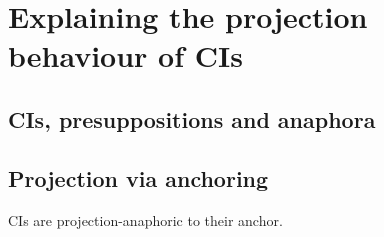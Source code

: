 \section{Explaining the projection behaviour of CIs}

\subsection{CIs, presuppositions and anaphora}

\citet{sandt1992presupposition}

\citep{potts2013presupposition}

\subsection{Projection via anchoring}

CIs are projection-anaphoric to their anchor.


